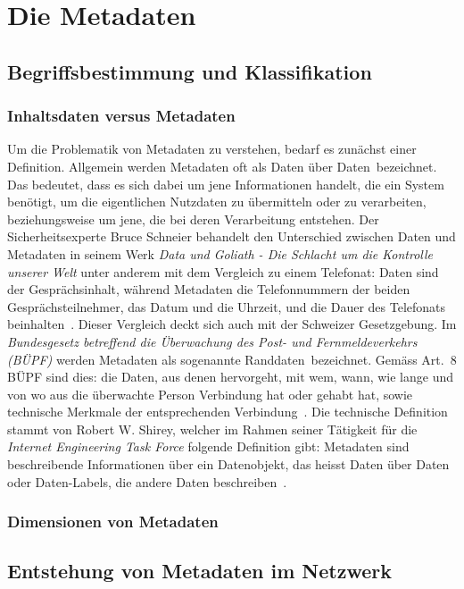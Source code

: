 \chapter{Die Metadaten}

\section{Begriffsbestimmung und Klassifikation}

\subsection{Inhaltsdaten versus Metadaten}
Um die Problematik von Metadaten zu verstehen, bedarf es zunächst einer Definition. Allgemein werden Metadaten oft als \glqq Daten über Daten\grqq\  bezeichnet. Das bedeutet, dass es sich dabei um jene Informationen handelt, die ein System benötigt, um die eigentlichen Nutzdaten zu übermitteln oder zu verarbeiten, beziehungsweise um jene, die bei deren Verarbeitung entstehen.
Der Sicherheitsexperte Bruce Schneier behandelt den Unterschied zwischen Daten und Metadaten in seinem Werk \emph{Data und Goliath - Die Schlacht um die Kontrolle unserer Welt} unter anderem mit dem Vergleich zu einem Telefonat: Daten sind der Gesprächsinhalt, während Metadaten die Telefonnummern der beiden Gesprächsteilnehmer, das Datum und die Uhrzeit, und die Dauer des Telefonats beinhalten~\cite[Kap.~2]{schneier2015data}.
Dieser Vergleich deckt sich auch mit der Schweizer Gesetzgebung. Im \emph{Bundesgesetz betreffend die Überwachung des Post- und Fernmeldeverkehrs (BÜPF)} werden Metadaten als sogenannte \glqq Randdaten\grqq\ bezeichnet. Gemäss Art.~8 BÜPF sind dies: die Daten, aus denen hervorgeht, mit wem, wann, wie lange und von wo aus die überwachte Person Verbindung hat oder gehabt hat, sowie technische Merkmale der entsprechenden Verbindung~\cite{buepf_ch}.
Die technische Definition stammt von Robert W. Shirey, welcher im Rahmen seiner Tätigkeit für die \emph{Internet Engineering Task Force} folgende Definition gibt: Metadaten sind beschreibende Informationen über ein Datenobjekt, das heisst Daten über Daten oder Daten-Labels, die andere Daten beschreiben~\cite{rfc4949}.
\subsection{Dimensionen von Metadaten}

\section{Entstehung von Metadaten im Netzwerk}

